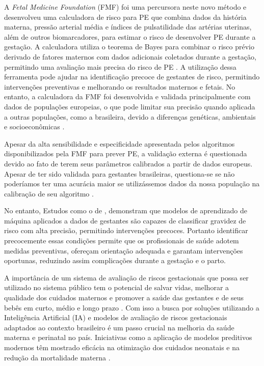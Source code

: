 \documentclass[12pt, a4paper]{report}
\theoremstyle{definition}
\theoremstyle{remark}
\theoremstyle{plain}
\begin{document}
A \textit{Fetal Medicine Foundation} (FMF) foi uma percursora neste novo método e desenvolveu uma calculadora de risco para PE que combina dados da história materna, pressão arterial média e índices de pulsatilidade das artérias uterinas, além de outros biomarcadores, para estimar o risco de desenvolver PE durante a gestação. A calculadora utiliza o teorema de Bayes para combinar o risco prévio derivado de fatores maternos com dados adicionais coletados durante a gestação, permitindo uma avaliação mais precisa do risco de PE \cite{Riishede2023}. A utilização dessa ferramenta pode ajudar na identificação precoce de gestantes de risco, permitindo intervenções preventivas e melhorando os resultados maternos e fetais. No entanto, a calculadora da FMF foi desenvolvida e validada principalmente com dados de populações europeias, o que pode limitar sua precisão quando aplicada a outras populações, como a brasileira, devido a diferenças genéticas, ambientais e socioeconômicas \cite{Rezende2024}.

Apesar da alta sensibilidade e especificidade apresentada pelos algoritmos disponibilizados pela FMF para prever PE, a validação externa é questionada devido ao fato de terem seus parâmetros calibrados a partir de dados europeus. Apesar de ter sido validada para gestantes brasileiras, questiona-se se não poderíamos ter uma acurácia maior se utilizássemos dados da nossa população na calibração de seu algoritmo \cite{bilda2024}.

No entanto, Estudos como o de \textcite{silva2021avaliacao}, demonstram que modelos de aprendizado de máquina aplicados a dados de gestantes são capazes de classificar gravidez de risco com alta precisão, permitindo intervenções precoces. Portanto identificar precocemente essas condições permite que os profissionais de saúde adotem medidas preventivas, ofereçam orientação adequada e garantam intervenções oportunas, reduzindo assim complicações durante a gestação e o parto. 

A importância de um sistema de avaliação de riscos gestacionais que possa ser utilizado no sistema público tem o potencial de salvar vidas, melhorar a qualidade dos cuidados maternos e promover a saúde das gestantes e de seus bebês em curto, médio e longo prazo \cite{brasil2022_gestacao_alto_risco}. Com isso a busca por soluções utilizando a Inteligência Artificial (IA) e modelos de avaliação de riscos gestacionais adaptados ao contexto brasileiro é um passo crucial na melhoria da saúde materna e perinatal no país. Iniciativas como a aplicação de modelos preditivos modernos têm mostrado eficácia na otimização dos cuidados neonatais e na redução da mortalidade materna \cite{alcino2024}.
\end{document}
